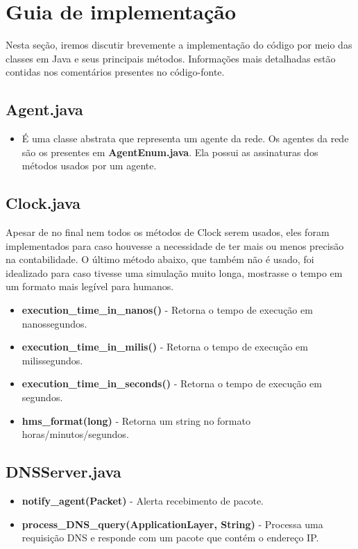 \documentclass[11pt]{article}
\begin{document}
\section{Guia de implementação}

Nesta seção, iremos discutir brevemente a implementação do código por meio das classes em Java e seus principais métodos. Informações mais detalhadas estão contidas nos comentários presentes no código-fonte.

\subsection{Agent.java}

\begin{itemize}
	\item É uma classe abstrata que representa um agente da rede. Os agentes da rede são os presentes em \textbf{AgentEnum.java}. Ela possui as assinaturas dos métodos usados por um agente.
\end{itemize}

\subsection{Clock.java}

Apesar de no final nem todos os métodos de Clock serem usados, eles foram implementados para caso houvesse a necessidade de ter mais ou menos precisão na contabilidade. O último método abaixo, que também não é usado, 
foi idealizado para caso tivesse uma simulação muito longa, mostrasse o tempo em um formato mais legível para humanos.
\begin{itemize}
	\item \textbf{execution\_time\_in\_nanos()} - Retorna o tempo de execução em nanossegundos.
	\item \textbf{execution\_time\_in\_milis()} - Retorna o tempo de execução em milissegundos.
	\item \textbf{execution\_time\_in\_seconds()} - Retorna o tempo de execução em segundos.
	\item \textbf{hms\_format(long)} - Retorna um string no formato horas/minutos/segundos.
\end{itemize}

\subsection{DNSServer.java}

\begin{itemize}
	\item \textbf{notify\_agent(Packet)} - Alerta recebimento de pacote.
	\item \textbf{process\_DNS\_query(ApplicationLayer, String)} - Processa uma requisição DNS e responde com um pacote que contém o endereço IP.
\end{itemize}
\end{document}
